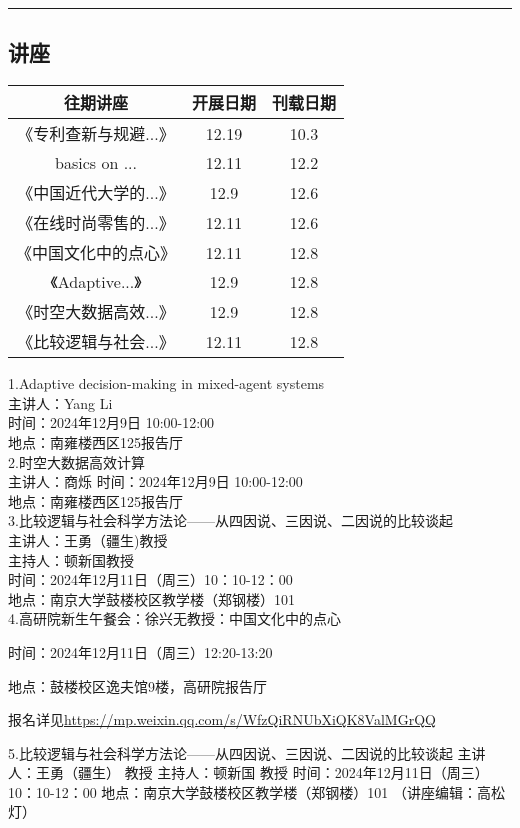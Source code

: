 \documentclass[letterpaper, 12pt]{article}
\begin{document}
\hrule
\pagebreak
\begin{multicols}{2}

\section{讲座}
\begin{tabular}{|c|c|c|}
    \hline
    往期讲座 & 开展日期 & 刊载日期\\
    \hline\hline
    《专利查新与规避...》 & 12.19 & 10.3\\
    basics on ... & 12.11 & 12.2\\
    《中国近代大学的...》 & 12.9 & 12.6\\
    《在线时尚零售的...》 & 12.11 & 12.6\\
    《中国文化中的点心》& 12.11 & 12.8\\
    《Adaptive...》 & 12.9 & 12.8\\
    《时空大数据高效...》 & 12.9 & 12.8\\
    《比较逻辑与社会...》 & 12.11 & 12.8\\
    \hline
\end{tabular}

1.Adaptive decision-making in mixed-agent systems\\
主讲人：Yang Li\\
时间：2024年12月9日 10:00-12:00\\
地点：南雍楼西区125报告厅\\
2.时空大数据高效计算\\
主讲人：商烁
时间：2024年12月9日 10:00-12:00\\
地点：南雍楼西区125报告厅\\
3.比较逻辑与社会科学方法论——从四因说、三因说、二因说的比较谈起\\
主讲人：王勇（疆生)教授\\
主持人：顿新国教授\\
时间：2024年12月11日（周三）10：10-12：00\\
地点：南京大学鼓楼校区教学楼（郑钢楼）101\\
4.高研院新生午餐会：徐兴无教授：中国文化中的点心

时间：2024年12月11日（周三）12:20-13:20

地点：鼓楼校区逸夫馆9楼，高研院报告厅

报名详见\url{https://mp.weixin.qq.com/s/WfzQiRNUbXiQK8ValMGrQQ}

5.比较逻辑与社会科学方法论——从四因说、三因说、二因说的比较谈起
主讲人：王勇（疆生） 教授
主持人：顿新国 教授
时间：2024年12月11日（周三）10：10-12：00
地点：南京大学鼓楼校区教学楼（郑钢楼）101 （讲座编辑：高松灯）



\end{multicols}
\end{document}
